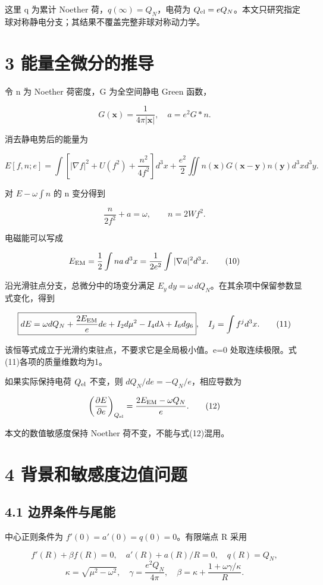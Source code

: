 \documentclass[UTF8,fontset=fandol,11pt]{ctexart}
\begin{document}
这里 q 为累计 Noether 荷，\(q(\infty)=Q_N\)，电荷为 \(Q_{\rm el}=eQ_N\)。本文只研究指定球对称静电分支；其结果不覆盖完整非球对称动力学。

\section*{3 能量全微分的推导}

令 n 为 Noether 荷密度，G 为全空间静电 Green 函数，

\[
G(\mathbf x)=\frac1{4\pi|\mathbf x|},\quad a=e^2G*n.
\tag{7}
\]

消去静电势后的能量为

\[
E[f,n;e]=\int\left[|\nabla f|^2+U(f^2)+\frac{n^2}{4f^2}\right]d^3x
+\frac{e^2}{2}\iint n(\mathbf x)G(\mathbf x-\mathbf y)n(\mathbf y)d^3x d^3y.
\tag{8}
\]

对 \(E-\omega\int n\) 的 n 变分得到

\[
\frac{n}{2f^2}+a=\omega,
\qquad n=2Wf^2.
\tag{9}
\]

电磁能可以写成

\[
E_{\rm EM}=\frac12\int na\,d^3x
=\frac1{2e^2}\int|\nabla a|^2d^3x.
\tag{10}
\]

沿光滑驻点分支，总微分中的场变分满足 \(E_y\,dy=\omega\,dQ_N\)。在其余项中保留参数显式变化，得到

\[
\boxed{dE=\omega dQ_N+\frac{2E_{\rm EM}}e de
+I_2d\mu^2-I_4d\lambda+I_6dg_6},
\quad I_j=\int f^j d^3x.
\tag{11}
\]

该恒等式成立于光滑约束驻点，不要求它是全局极小值。e=0 处取连续极限。式(11)各项的质量维数均为1。

如果实际保持电荷 \(Q_{\rm el}\) 不变，则 \(dQ_N/de=-Q_N/e\)，相应导数为

\[
\left(\frac{\partial E}{\partial e}\right)_{Q_{\rm el}}
=\frac{2E_{\rm EM}-\omega Q_N}{e}.
\tag{12}
\]

本文的数值敏感度保持 Noether 荷不变，不能与式(12)混用。

\section*{4 背景和敏感度边值问题}

\subsection*{4.1 边界条件与尾能}

中心正则条件为 \(f'(0)=a'(0)=q(0)=0\)。有限端点 R 采用

\[
f'(R)+\beta f(R)=0,\quad a'(R)+a(R)/R=0,\quad q(R)=Q_N,
\tag{13}
\]
\[
\kappa=\sqrt{\mu^2-\omega^2},\quad
\gamma=\frac{e^2Q_N}{4\pi},\quad
\beta=\kappa+\frac{1+\omega\gamma/\kappa}{R}.
\tag{14}
\]
\end{document}
